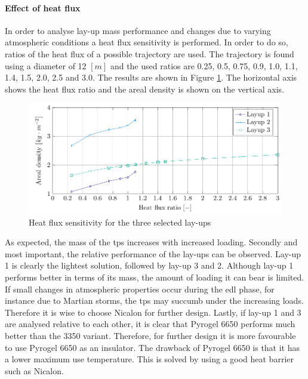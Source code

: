 \paragraph{Effect of heat flux}
In order to analyse lay-up mass performance and changes due to varying atmospheric conditions a heat flux sensitivity is performed. In order to do so, ratios of the heat flux of a possible trajectory are used. The trajectory is found using a diameter of 12 $ \left[ m \right]$ and the used ratios are 0.25, 0.5, 0.75, 0.9, 1.0, 1.1, 1.4, 1.5, 2.0, 2.5 and 3.0. The results are shown in Figure \ref{fig:sensitivityq}. The horizontal axis shows the heat flux ratio and the areal density is shown on the vertical axis. 

\begin{figure}[h]
	\centering
	\includegraphics{./Figure/Thermal/Sensitivityq.pdf}
	\caption{Heat flux sensitivity for the three selected lay-ups}
	\label{fig:sensitivityq}
\end{figure}


As expected, the mass of the \gls{tps} increases with increased loading. Secondly and most important, the relative performance of the lay-ups can be observed. Lay-up 1 is clearly the lightest solution, followed by lay-up 3 and 2. Although lay-up 1 performs better in terms of its mass, the amount of loading it can bear is limited. If small changes in atmospheric properties occur during the \gls{edl} phase, for instance due to Martian storms, the \gls{tps} may succumb under the increasing loads. Therefore it is wise to choose Nicalon for further design. Lastly, if lay-up 1 and 3 are analysed relative to each other, it is clear that Pyrogel 6650 performs much better than the 3350 variant. Therefore, for further design it is more favourable to use Pyrogel 6650 as an insulator. The drawback of Pyrogel 6650 is that it has a lower maximum use temperature. This is solved by using a good heat barrier such as Nicalon.

